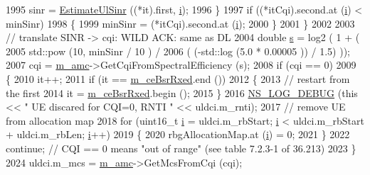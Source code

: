 \begin{DoxyCode}
1995                   sinr = \hyperlink{classns3_1_1FdTbfqFfMacScheduler_a796f3c39b9129b67c429d9d122525ae0}{EstimateUlSinr} ((*it).first, \hyperlink{bernuolliDistribution_8m_a6f6ccfcf58b31cb6412107d9d5281426}{i});
1996                 \}
1997               \textcolor{keywordflow}{if} ((*itCqi).second.at (\hyperlink{bernuolliDistribution_8m_a6f6ccfcf58b31cb6412107d9d5281426}{i}) < minSinr)
1998                 \{
1999                   minSinr = (*itCqi).second.at (\hyperlink{bernuolliDistribution_8m_a6f6ccfcf58b31cb6412107d9d5281426}{i});
2000                 \}
2001             \}
2002 
2003           \textcolor{comment}{// translate SINR -> cqi: WILD ACK: same as DL}
2004           \textcolor{keywordtype}{double} \hyperlink{generate__test__data__lte__sinr_8m_ad83eeb3a142285d1243a08c6b7026df8}{s} = log2 ( 1 + (
2005                                  std::pow (10, minSinr / 10 )  /
2006                                  ( (-std::log (5.0 * 0.00005 )) / 1.5) ));
2007           cqi = \hyperlink{classns3_1_1FdTbfqFfMacScheduler_a53e0bcb714cd32ee639f7b4e7265087c}{m\_amc}->GetCqiFromSpectralEfficiency (s);
2008           \textcolor{keywordflow}{if} (cqi == 0)
2009             \{
2010               it++;
2011               \textcolor{keywordflow}{if} (it == \hyperlink{classns3_1_1FdTbfqFfMacScheduler_a4affe9fe434a4cb87f5875ddf1766d61}{m\_ceBsrRxed}.end ())
2012                 \{
2013                   \textcolor{comment}{// restart from the first}
2014                   it = \hyperlink{classns3_1_1FdTbfqFfMacScheduler_a4affe9fe434a4cb87f5875ddf1766d61}{m\_ceBsrRxed}.begin ();
2015                 \}
2016               \hyperlink{group__logging_ga413f1886406d49f59a6a0a89b77b4d0a}{NS\_LOG\_DEBUG} (\textcolor{keyword}{this} << \textcolor{stringliteral}{" UE discared for CQI=0, RNTI "} << uldci.m\_rnti);
2017               \textcolor{comment}{// remove UE from allocation map}
2018               \textcolor{keywordflow}{for} (uint16\_t \hyperlink{bernuolliDistribution_8m_a6f6ccfcf58b31cb6412107d9d5281426}{i} = uldci.m\_rbStart; \hyperlink{bernuolliDistribution_8m_a6f6ccfcf58b31cb6412107d9d5281426}{i} < uldci.m\_rbStart + uldci.m\_rbLen; 
      \hyperlink{bernuolliDistribution_8m_a6f6ccfcf58b31cb6412107d9d5281426}{i}++)
2019                 \{
2020                   rbgAllocationMap.at (\hyperlink{bernuolliDistribution_8m_a6f6ccfcf58b31cb6412107d9d5281426}{i}) = 0;
2021                 \}
2022               \textcolor{keywordflow}{continue}; \textcolor{comment}{// CQI == 0 means "out of range" (see table 7.2.3-1 of 36.213)}
2023             \}
2024           uldci.m\_mcs = \hyperlink{classns3_1_1FdTbfqFfMacScheduler_a53e0bcb714cd32ee639f7b4e7265087c}{m\_amc}->GetMcsFromCqi (cqi);

\end{DoxyCode}
